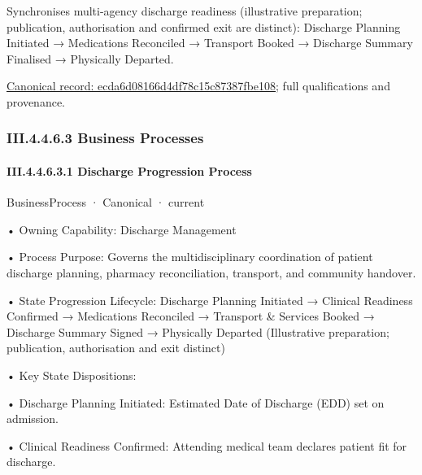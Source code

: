 Synchronises multi-agency discharge readiness (illustrative preparation; publication, authorisation and confirmed exit are distinct): Discharge Planning Initiated → Medications Reconciled → Transport Booked → Discharge Summary Finalised → Physically Departed.


{\footnotesize \href{../../../../../../../continuum/business/business-function/ecda6d08166d4df78c15c87387fbe108.md}{Canonical record: ecda6d08166d4df78c15c87387fbe108}; full qualifications and provenance.}\par
\subsubsection*{III.4.4.6.3 Business Processes}
\label{navigation:III.4.4.6.3}

\paragraph*{III.4.4.6.3.1 Discharge Progression Process}
\label{navigation:III.4.4.6.3.1}

\label{element:7165955d9c454175a04b9ad00293f011}
{\small BusinessProcess · Canonical · current}\par

•
Owning Capability: Discharge Management



•
Process Purpose: Governs the multidisciplinary coordination of patient discharge planning, pharmacy reconciliation, transport, and community handover.



•
State Progression Lifecycle: Discharge Planning Initiated → Clinical Readiness Confirmed → Medications Reconciled → Transport \& Services Booked → Discharge Summary Signed → Physically Departed   (Illustrative preparation; publication, authorisation and exit distinct)



•
Key State Dispositions:



•
Discharge Planning Initiated: Estimated Date of Discharge (EDD) set on admission.



•
Clinical Readiness Confirmed: Attending medical team declares patient fit for discharge.



